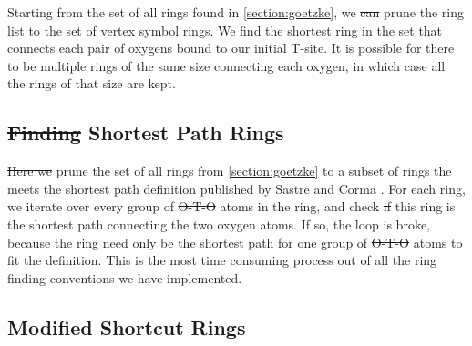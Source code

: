 \documentclass[preprint,numrefs,noinfo,sort&compress]{elsarticle}
\providecommand{\DIFadd}[1]{{\protect\color{blue}\uwave{#1}}} %
\providecommand{\DIFdel}[1]{{\protect\color{red}\sout{#1}}}                      %
\providecommand{\DIFaddbegin}{} %
\providecommand{\DIFaddend}{} %
\providecommand{\DIFdelbegin}{} %
\providecommand{\DIFdelend}{} %
\newcommand{\DIFscaledelfig}{0.5}
\newlength{\DIFdelgraphicswidth} %
\newlength{\DIFdelgraphicsheight} %
\newcommand{\DIFaddincludegraphics}[2][]{{\color{blue}\fbox{\DIFOincludegraphics[#1]{#2}}}} %
\newcommand{\DIFdelincludegraphics}[2][]{%
\sbox{\DIFdelgraphicsbox}{\DIFOincludegraphics[#1]{#2}}%
\settoboxwidth{\DIFdelgraphicswidth}{\DIFdelgraphicsbox} %
\settoboxtotalheight{\DIFdelgraphicsheight}{\DIFdelgraphicsbox} %
\scalebox{\DIFscaledelfig}{%
\parbox[b]{\DIFdelgraphicswidth}{\usebox{\DIFdelgraphicsbox}\\[-\baselineskip] \rule{\DIFdelgraphicswidth}{0em}}\llap{\resizebox{\DIFdelgraphicswidth}{\DIFdelgraphicsheight}{%
\setlength{\unitlength}{\DIFdelgraphicswidth}%
\begin{picture}(1,1)%
\thicklines\linethickness{2pt} %
{\color[rgb]{1,0,0}\put(0,0){\framebox(1,1){}}}%
{\color[rgb]{1,0,0}\put(0,0){\line( 1,1){1}}}%
{\color[rgb]{1,0,0}\put(0,1){\line(1,-1){1}}}%
\end{picture}%
}\hspace*{3pt}}} %
} %
\DeclareRobustCommand{\DIFaddbegin}{\DIFOaddbegin \let\includegraphics\DIFaddincludegraphics} %
\DeclareRobustCommand{\DIFaddend}{\DIFOaddend \let\includegraphics\DIFOincludegraphics} %
\DeclareRobustCommand{\DIFdelbegin}{\DIFOdelbegin \let\includegraphics\DIFdelincludegraphics} %
\DeclareRobustCommand{\DIFdelend}{\DIFOaddend \let\includegraphics\DIFOincludegraphics} %
\begin{document}
Starting from the set of all rings found in \cref{section:goetzke}, we \DIFdelbegin \DIFdel{can }\DIFdelend prune the ring list to the set of vertex symbol rings. We find the shortest ring in the set that connects each pair of oxygens bound to our initial T-site. It is possible for there to be multiple rings of the same size connecting each oxygen, in which case all the rings of that size are kept. 

\subsection{\DIFdelbegin \DIFdel{Finding }\DIFdelend Shortest Path Rings}
\DIFdelbegin %
\DIFdelend \DIFaddbegin \label{sec:org6be3a64}
\DIFaddend 

\DIFdelbegin \DIFdel{Here we }\DIFdelend \DIFaddbegin \DIFadd{We }\DIFaddend prune the set of all rings from \cref{section:goetzke} to a subset of rings the meets the shortest path definition published by Sastre and Corma \cite{sastre-topological-2009}. For each ring, we iterate over every group of \DIFdelbegin \DIFdel{O-T-O }\DIFdelend \DIFaddbegin \DIFadd{\ce{O-T-O} }\DIFaddend atoms in the ring, and check \DIFdelbegin \DIFdel{if }\DIFdelend \DIFaddbegin \DIFadd{whether }\DIFaddend this ring is the shortest path connecting the two oxygen atoms. If so, the loop is broke, because the ring need only be the shortest path for one group of \DIFdelbegin \DIFdel{O-T-O }\DIFdelend \DIFaddbegin \DIFadd{\ce{O-T-O} }\DIFaddend atoms to fit the definition. This is the most time consuming process out of all the ring finding conventions we have implemented.

\subsection{Modified Shortcut Rings \DIFaddbegin \label{section:modified}\DIFaddend }
\DIFdelbegin %
\end{document}
